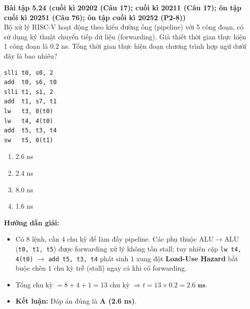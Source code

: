\textbf{Bài tập 5.24 (cuối kì 20202 (Câu 17); cuối kì 20211 (Câu 17); ôn tập cuối kì 20251 (Câu 76); ôn tập cuối kì 20252 (P2-8))}\\
Bộ xử lý RISC-V hoạt động theo kiểu đường ống (pipeline) với 5 công đoạn, có sử dụng kỹ thuật chuyển tiếp dữ liệu (forwarding). Giả thiết thời gian thực hiện 1 công đoạn là $0.2\text{ ns}$. Tổng thời gian thực hiện đoạn chương trình hợp ngữ dưới đây là bao nhiêu?
\begin{lstlisting}
slli t0, s0, 2
add  t0, s6, t0
slli t1, s1, 2
add  t1, s7, t1
lw   t3, 0(t0)
lw   t4, 4(t0)
add  t5, t3, t4
sw   t5, 0(t1)
\end{lstlisting}
\begin{enumerate}[label=\Alph*.]
    \item 2.6 ns
    \item 2.4 ns
    \item 8.0 ns
    \item 1.6 ns
\end{enumerate}
\textbf{Hướng dẫn giải:}
\begin{itemize}
    \item Có $8$ lệnh, cần $4$ chu kỳ để làm đầy pipeline. Các phụ thuộc ALU$\rightarrow$ALU (\texttt{t0, t1, t5}) được forwarding xử lý không tốn stall; tuy nhiên cặp \texttt{lw t4, 4(t0)} $\rightarrow$ \texttt{add t5, t3, t4} phát sinh $1$ xung đột \textbf{Load-Use Hazard} bắt buộc chèn $1$ chu kỳ trễ (stall) ngay cả khi có forwarding.
    \item Tổng chu kỳ $= 8 + 4 + 1 = 13$ chu kỳ $\Rightarrow t = 13 \times 0.2 = \mathbf{2.6\text{ ns}}$.
    \item \textbf{Kết luận:} Đáp án đúng là \textbf{A (2.6 ns)}.
\end{itemize}

